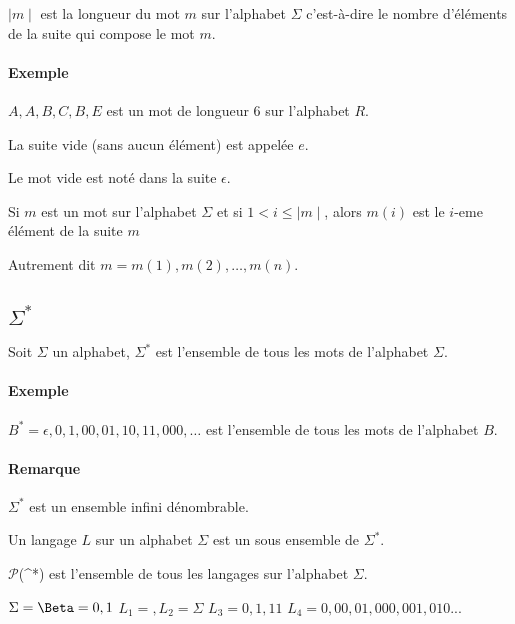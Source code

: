 \documentclass[12pt, a4paper]{report}
\begin{document}
$\mid m \mid$ est la longueur du mot $m$ sur l'alphabet $\Sigma$ c'est-à-dire le nombre d'éléments de
la suite qui compose le mot $m$.

\paragraph{Exemple}

$A, A, B, C, B, E$ est un mot de longueur $6$ sur l'alphabet $R$.

La suite vide (sans aucun élément) est appelée $e$.

Le mot vide est noté dans la suite $\epsilon$.

Si $m$ est un mot sur l'alphabet $\Sigma$ et si $1 < i \leq \mid m \mid$,
alors $m(i)$ est le $i$-eme élément de la suite $m$

Autrement dit $m = m(1), m(2), \dots, m(n)$.

\subsection{$\Sigma^{*}$}

Soit $\Sigma$ un alphabet, $\Sigma^{*}$ est l'ensemble de tous les mots de
l'alphabet $\Sigma$.

\paragraph{Exemple}

$B^{*} = { \epsilon, 0, 1, 00, 01, 10, 11, 000, \dots}$ est l'ensemble de tous
les mots de l'alphabet $B$. %

\paragraph{Remarque}
$\Sigma^{*}$ est un ensemble infini dénombrable.


Un langage $L$ sur un alphabet $\Sigma$ est un sous ensemble de $\Sigma^{*}$.

 $\mathcal{P}$(\Sigma^{*}) est l'ensemble de tous les langages sur l'alphabet
 $\Sigma$.
 
 $\Sigma = \Beta = {0,1}$
$L_1 = {}, L_2 = {\Sigma}$
$L_3 = {0,1,11}$
$L_4 = {0,00,01,000,001,010 ... }$

\subsection{}
\end{document}
